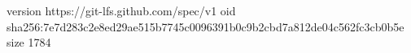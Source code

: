 version https://git-lfs.github.com/spec/v1
oid sha256:7e7d283c2e8ed29ae515b7745c0096391b0c9b2cbd7a812de04c562fc3cb0b5e
size 1784
